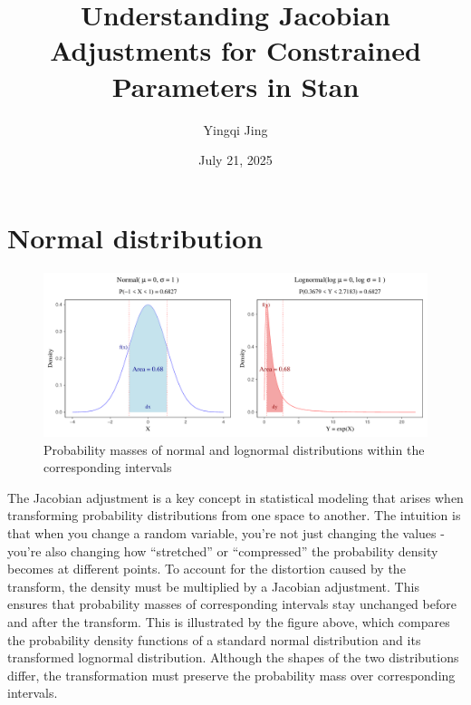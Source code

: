 \documentclass[
  letterpaper,
  DIV=11,
  numbers=noendperiod]{scrartcl}
\title{Understanding Jacobian Adjustments for Constrained Parameters in
Stan}
\author{Yingqi Jing}
\date{July 21, 2025}
\renewcommand*\contentsname{Table of contents}
\newcommand\contentsname{Table of contents}
\begin{document}
\maketitle

\renewcommand*\contentsname{Contents}
{
\hypersetup{linkcolor=}
\setcounter{tocdepth}{4}
\tableofcontents
}
\listoffigures
\listoftables

\clearpage

\section{Normal distribution}\label{normal-distribution}

\begin{figure}[H]

{\centering \includegraphics{figures/unnamed-chunk-1-1.pdf}

}

\caption{Probability masses of normal and lognormal distributions within
the corresponding intervals}

\end{figure}%

The Jacobian adjustment is a key concept in statistical modeling that
arises when transforming probability distributions from one space to
another. The intuition is that when you change a random variable, you're
not just changing the values - you're also changing how ``stretched'' or
``compressed'' the probability density becomes at different points. To
account for the distortion caused by the transform, the density must be
multiplied by a Jacobian adjustment. This ensures that probability
masses of corresponding intervals stay unchanged before and after the
transform. This is illustrated by the figure above, which compares the
probability density functions of a standard normal distribution and its
transformed lognormal distribution. Although the shapes of the two
distributions differ, the transformation must preserve the probability
mass over corresponding intervals.
\end{document}
